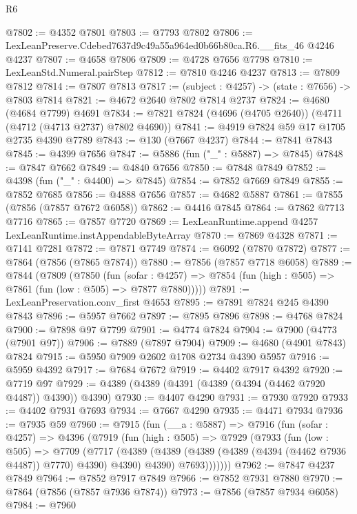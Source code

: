 \begin{lexlean}{R6}
\begin{coremodule}
@7802 := @4352 @7801
@7803 := @7793 @7802
@7806 := LexLeanPreserve.Cdebed7637d9c49a55a964ed0b66b80ca.R6.__fits_46 @4246 @4237
@7807 := @4658 @7806
@7809 := @4728 @7656 @7798
@7810 := LexLeanStd.Numeral.pairStep
@7812 := @7810 @4246 @4237
@7813 := @7809 @7812
@7814 := @7807 @7813
@7817 := (subject : @4257) -> (state : @7656) -> @7803 @7814
@7821 := @4672 @2640 @7802 @7814 @2737
@7824 := @4680 (@4684 @7799) @4691
@7834 := @7821 @7824 (@4696 (@4705 @2640)) (@4711 (@4712 (@4713 @2737) @7802 @4690))
@7841 := @4919 @7824 @59 @17 @1705 @2735 @4390 @7789
@7843 := @130 (@7667 @4237)
@7844 := @7841 @7843
@7845 := @4399 @7656
@7847 := @5886 (fun ("_" : @5887) => @7845)
@7848 := @7847 @7662
@7849 := @4840 @7656
@7850 := @7848 @7849
@7852 := @4398 (fun ("_" : @4400) => @7845)
@7854 := @7852 @7669 @7849
@7855 := @7852 @7685
@7856 := @4888 @7656
@7857 := @4682 @5887
@7861 := @7855 (@7856 (@7857 @7672 @6058))
@7862 := @4416 @7845
@7864 := @7862 @7713 @7716
@7865 := @7857 @7720
@7869 := LexLeanRuntime.append @4257 LexLeanRuntime.instAppendableByteArray
@7870 := @7869 @4328
@7871 := @7141 @7281
@7872 := @7871 @7749
@7874 := @6092 (@7870 @7872)
@7877 := @7864 (@7856 (@7865 @7874))
@7880 := @7856 (@7857 @7718 @6058)
@7889 := @7844
    (@7809
      (@7850
        (fun (sofar : @4257) =>
        @7854 (fun (high : @505) => @7861 (fun (low : @505) => @7877 @7880)))))
@7891 := LexLeanPreservation.conv_first @4653
@7895 := @7891 @7824 @245 @4390 @7843
@7896 := @5957 @7662
@7897 := @7895 @7896
@7898 := @4768 @7824
@7900 := @7898 @97 @7799
@7901 := @4774 @7824
@7904 := @7900 (@4773 (@7901 @97))
@7906 := @7889 (@7897 @7904)
@7909 := @4680 (@4901 @7843) @7824
@7915 := @5950 @7909 @2602 @1708 @2734 @4390 @5957
@7916 := @5959 @4392
@7917 := @7684 @7672
@7919 := @4402 @7917 @4392
@7920 := @7719 @97
@7929 := @4389 (@4389 (@4391 (@4389 (@4394 (@4462 @7920 @4487)) @4390)) @4390)
@7930 := @4407 @4290
@7931 := @7930 @7920
@7933 := @4402 @7931 @7693
@7934 := @7667 @4290
@7935 := @4471 @7934
@7936 := @7935 @59
@7960 := @7915
    (fun (__a : @5887) =>
    @7916
      (fun (sofar : @4257) =>
      @4396
        (@7919
          (fun (high : @505) =>
          @7929
            (@7933
              (fun (low : @505) =>
              @7709
                (@7717
                  (@4389
                    (@4389 (@4389 (@4389 (@4394 (@4462 @7936 @4487)) @7770) @4390) @4390)
                    @4390)
                  @7693)))))))
@7962 := @7847 @4237 @7849
@7964 := @7852 @7917 @7849
@7966 := @7852 @7931 @7880
@7970 := @7864 (@7856 (@7857 @7936 @7874))
@7973 := @7856 (@7857 @7934 @6058)
@7984 := @7960

\end{coremodule}
\end{lexlean}
